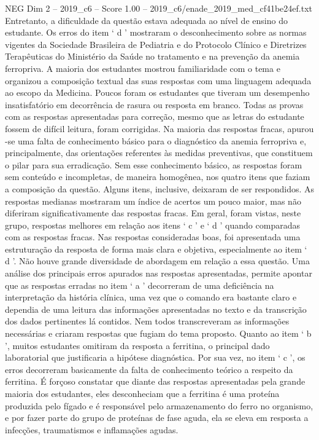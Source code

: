 \begin{textsample}{NEG Dim 2 – 2019\_c6 – Score 1.00 – 2019\_c6/enade\_2019\_med\_cf41be24ef.txt}
Entretanto, a dificuldade da questão estava adequada ao nível de ensino do estudante.
Os erros do item ‘ d ’ mostraram o desconhecimento sobre as normas vigentes da Sociedade Brasileira de Pediatria e do Protocolo Clínico e Diretrizes Terapêuticas do Ministério da Saúde no tratamento e na prevenção da anemia ferropriva.
A maioria dos estudantes mostrou familiaridade com o tema e organizou a composição textual das suas respostas com uma linguagem adequada ao escopo da Medicina.
Poucos foram os estudantes que tiveram um desempenho insatisfatório em decorrência de rasura ou resposta em branco.
Todas as provas com as respostas apresentadas para correção, mesmo que as letras do estudante fossem de difícil leitura, foram corrigidas.
Na maioria das respostas fracas, apurou -se uma falta de conhecimento básico para o diagnóstico da anemia ferropriva e, principalmente, das orientações referentes às medidas preventivas, que constituem o pilar para sua erradicação.
Sem esse conhecimento básico, as respostas foram sem conteúdo e incompletas, de maneira homogênea, nos quatro itens que faziam a composição da questão.
Alguns itens, inclusive, deixaram de ser respondidos.
As respostas medianas mostraram um índice de acertos um pouco maior, mas não diferiram significativamente das respostas fracas.
Em geral, foram vistas, neste grupo, respostas melhores em relação aos itens ‘ c ’ e ‘ d ’ quando comparadas com as respostas fracas.
Nas respostas consideradas boas, foi apresentada uma estruturação da resposta de forma mais clara e objetiva, especialmente ao item ‘ d ’.
Não houve grande diversidade de abordagem em relação a essa questão.
Uma análise dos principais erros apurados nas respostas apresentadas, permite apontar que as respostas erradas no item ‘ a ’ decorreram de uma deficiência na interpretação da história clínica, uma vez que o comando era bastante claro e dependia de uma leitura das informações apresentadas no texto e da transcrição dos dados pertinentes lá contidos.
Nem todos transcreveram as informações necessárias e criaram respostas que fugiam do tema proposto.
Quanto ao item ‘ b ’, muitos estudantes omitiram da resposta a ferritina, o principal dado laboratorial que justificaria a hipótese diagnóstica.
Por sua vez, no item ‘ c ’, os erros decorreram basicamente da falta de conhecimento teórico a respeito da ferritina.
É forçoso constatar que diante das respostas apresentadas pela grande maioria dos estudantes, eles desconheciam que a ferritina é uma proteína produzida pelo fígado e é responsável pelo armazenamento do ferro no organismo, e por fazer parte do grupo de proteínas de fase aguda, ela se eleva em resposta a infecções, traumatismos e inflamações agudas.

\end{textsample}
